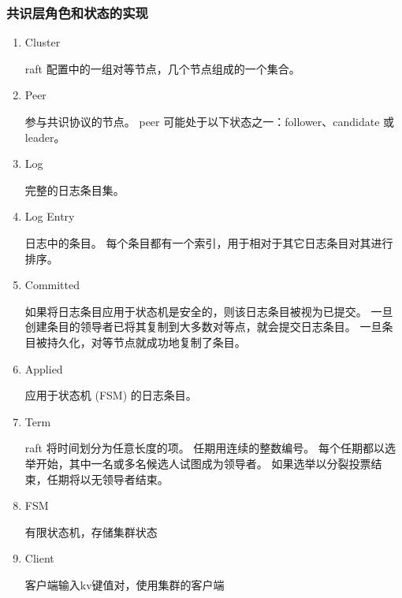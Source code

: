 		\subsubsection{共识层角色和状态的实现}
			\begin{enumerate}
				\item Cluster 
				 
					raft 配置中的一组对等节点，几个节点组成的一个集合。

				\item Peer
				
					参与共识协议的节点。 peer 可能处于以下状态之一：follower、candidate 或 leader。

				\item Log
					
					完整的日志条目集。
				\item Log Entry 
				
					日志中的条目。 每个条目都有一个索引，用于相对于其它日志条目对其进行排序。
				\item Committed 
				
					如果将日志条目应用于状态机是安全的，则该日志条目被视为已提交。 
					一旦创建条目的领导者已将其复制到大多数对等点，就会提交日志条目。 
					一旦条目被持久化，对等节点就成功地复制了条目。
				\item Applied 
					
					应用于状态机 (FSM) 的日志条目。
				\item Term 

					raft 将时间划分为任意长度的项。 
					任期用连续的整数编号。 
					每个任期都以选举开始，其中一名或多名候选人试图成为领导者。 
					如果选举以分裂投票结束，任期将以无领导者结束。
				\item FSM 
					
					有限状态机，存储集群状态
				\item Client

					客户端输入kv键值对，使用集群的客户端
			\end{enumerate}

		
